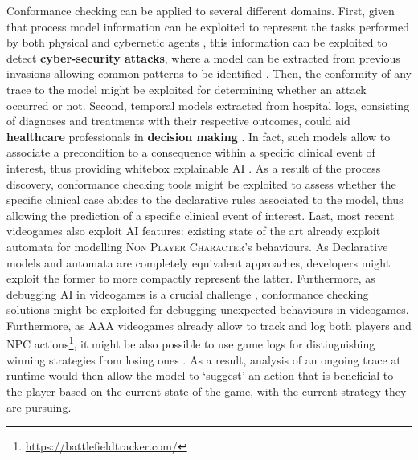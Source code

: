 Conformance checking can be applied to several different domains. First, given that process model information can be exploited to represent the tasks performed by both physical and cybernetic agents \cite{Ioanna}, this information can be exploited to detect \textbf{cyber-security attacks}, where a model can be extracted from previous invasions allowing common patterns to be identified \cite{BENASHER201551,LagraaS20}. Then, the conformity of any trace to the model might be exploited for determining whether an attack occurred or not. Second, temporal models extracted from hospital logs, consisting of diagnoses and treatments with their respective outcomes, could aid \textbf{healthcare} professionals in \textbf{decision making} \cite{Amantea2020}. In fact, such models allow to associate a precondition to a consequence within a specific clinical event of interest, thus providing whitebox explainable AI \cite{mining,KusumaKMHGJ20}. As a result of the process discovery, conformance checking tools might be exploited to assess whether the specific clinical case abides to the declarative rules associated to the model, thus allowing the prediction of a specific clinical event of interest. Last, most recent videogames also exploit AI features: existing state of the art already exploit automata \cite{Miyake2017} for modelling \textsc{Non Player Character}'s behaviours. As Declarative models and automata are completely equivalent approaches, developers might exploit the former to more compactly represent the latter. Furthermore, as debugging AI in videogames is a crucial challenge \cite{john2019debugging}, conformance checking solutions might be exploited for debugging unexpected behaviours in videogames. Furthermore, as AAA videogames already allow to track and log both players and NPC actions\footnote{\url{https://battlefieldtracker.com/}}, it might be also possible to use game logs for distinguishing winning strategies from losing ones \cite{mining}. As a result, analysis of an ongoing trace at runtime would then allow the model to `suggest' an action that is beneficial to the player based on the current state of the game, with the current strategy they are pursuing.





